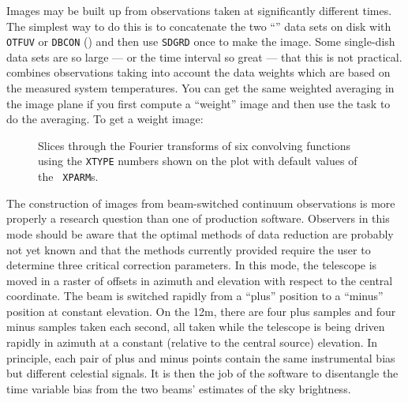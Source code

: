      Images may be built up from observations taken at significantly
different times.  The simplest way to do this is to concatenate the
two ``\uv'' data sets on disk with {\tt OTFUV} or {\tt DBCON}
() and then use {\tt SDGRD} once to make the image.  Some
single-dish data sets are so large --- or the time interval so
great --- that this is not practical.  {\tt {}} combines
observations taking into account the data weights which are based on
the measured system temperatures.  You can get the same weighted
averaging in the image plane if you first compute a ``weight'' image
and then use the task {\tt {}} to do the averaging.  To get
a weight image:

\begin{figure}
\centering
\caption[Convolving function Fourier transforms.]{Slices through the
Fourier transforms of six convolving functions using the {\tt XTYPE}
numbers shown on the plot with default values of the {\tt
XPARM}s.}
\label{fig:FFTconvl}
\end{figure}


     The construction of images from beam-switched 
continuum observations is more properly a research question than one
of production software.  Observers in this mode should be aware that
the optimal methods of data reduction are probably not yet known and
that the methods currently provided require the user to determine
three critical correction parameters.  In this mode, the telescope is
moved in a raster of offsets in azimuth and elevation with respect to
the central coordinate.  The beam is switched rapidly from a ``plus''
position to a ``minus'' position at constant elevation.  On the 12m,
there are four plus samples and four minus samples taken each second,
all taken while the telescope is being driven rapidly in azimuth at a
constant (relative to the central source) elevation.  In principle,
each pair of plus and minus points contain the same instrumental bias
but different celestial signals.  It is then the job of the software
to disentangle the time variable bias from the two beams' estimates of
the sky brightness.

